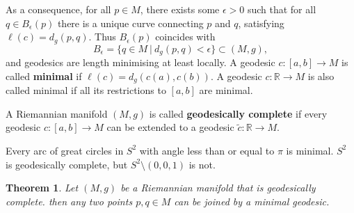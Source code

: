 \documentclass[letter-paper]{tufte-book}
\newtheorem{theorem}{\color{pastel-blue}Theorem}[section]
\newenvironment{example}[1][Example]{\begin{trivlist}
\item[\hskip \labelsep {\bfseries #1}]}{\end{trivlist}}
\begin{document}
As a consequence, for all $p\in M$, there exists some $\epsilon > 0$ such that for all $q \in B_\epsilon(p)$ there is a unique curve connecting $p$ and $q$, satisfying $\ell(c) = d_g(p,q)$. Thus $B_\epsilon(p)$ coincides with
\begin{equation*}
  B_\epsilon = \{q\in M\ |\ d_g(p,q) < \epsilon\} \subset (M,g),
\end{equation*}
and geodesics are length minimising at least locally. A geodesic $c:[a,b] \to M$ is called \textbf{minimal} if $\ell(c) = d_g(c(a), c(b))$. A geodesic $c:\mathbb{R}\to M$ is also called minimal if all its restrictions to $[a,b]$ are minimal.

A Riemannian manifold $(M,g)$ is called \textbf{geodesically complete} if every geodesic $c:[a,b] \to M$ can be extended to a geodesic $\tilde{c}: \mathbb{R} \to M$.

\begin{example}
  Every arc of great circles in $S^2$ with angle less than or equal to $\pi$ is minimal. $S^2$ is geodesically complete, but $S^2 \setminus (0,0,1)$ is not.
\end{example}

\begin{theorem}
  Let $(M,g)$ be a Riemannian manifold that is geodesically complete. then any two points $p,q \in M$ can be joined by a minimal geodesic.
\end{theorem}
\end{document}
